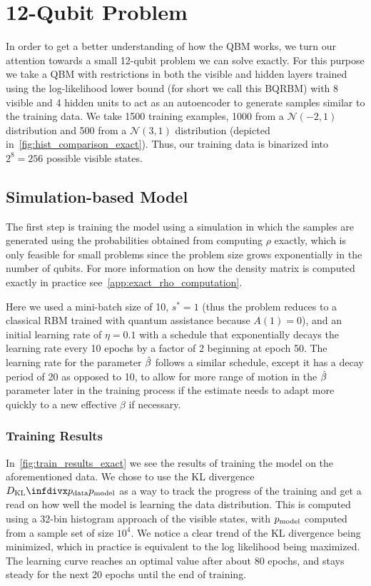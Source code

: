 \section{12-Qubit Problem}
In order to get a better understanding of how the QBM works, we turn our attention towards a small 12-qubit problem we can solve exactly.
For this purpose we take a QBM with restrictions in both the visible and hidden layers trained using the log-likelihood lower bound (for short we call this BQRBM) with 8 visible and 4 hidden units to act as an autoencoder to generate samples similar to the training data.
We take 1500 training examples, 1000 from a \( \mathcal{N}(-2, 1) \) distribution and 500 from a \( \mathcal{N}(3, 1) \) distribution (depicted in~\cref{fig:hist_comparison_exact}).
Thus, our training data is binarized into \( 2^8 = 256 \) possible visible states.

\subsection{Simulation-based Model}
The first step is training the model using a simulation in which the samples are generated using the probabilities obtained from computing \( \rho \) exactly, which is only feasible for small problems since the problem size grows exponentially in the number of qubits.
For more information on how the density matrix is computed exactly in practice see~\cref{app:exact_rho_computation}.

Here we used a mini-batch size of 10, \( s^* = 1 \) (thus the problem reduces to a classical RBM trained with quantum assistance because \( A(1) = 0 \)), and an initial learning rate of \( \eta = 0.1 \) with a schedule that exponentially decays the learning rate every 10 epochs by a factor of 2 beginning at epoch 50.
The learning rate for the parameter \( \hat{\beta} \) follows a similar schedule, except it has a decay period of 20 as opposed to 10, to allow for more range of motion in the \( \hat{\beta} \) parameter later in the training process if the estimate needs to adapt more quickly to a new effective \( \beta \) if necessary.

\subsubsection{Training Results}
In~\cref{fig:train_results_exact} we see the results of training the model on the aforementioned data.
We chose to use the KL divergence \( \DKL{\pdata}{\pmodel} \) as a way to track the progress of the training and get a read on how well the model is learning the data distribution.
This is computed using a 32-bin histogram approach of the visible states, with \( p_{\text{model}} \) computed from a sample set of size \( 10^4 \).
We notice a clear trend of the KL divergence being minimized, which in practice is equivalent to the log likelihood being maximized.
The learning curve reaches an optimal value after about 80 epochs, and stays steady for the next 20 epochs until the end of training.

